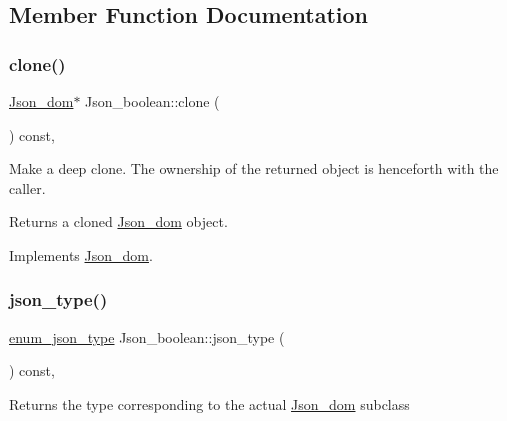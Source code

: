 \subsection{Member Function Documentation}
\mbox{\label{classJson__boolean_a4af266d49e532a2155e68a5b9fbcbff9}} 
\subsubsection{\texorpdfstring{clone()}{clone()}}
{\footnotesize\ttfamily \mbox{\hyperlink{classJson__dom}{Json\+\_\+dom}}$\ast$ Json\+\_\+boolean\+::clone (\begin{DoxyParamCaption}{ }\end{DoxyParamCaption}) const\hspace{0.3cm}{\ttfamily [inline]}, {\ttfamily [virtual]}}

Make a deep clone. The ownership of the returned object is henceforth with the caller.

\begin{DoxyReturn}{Returns}
a cloned \mbox{\hyperlink{classJson__dom}{Json\+\_\+dom}} object. 
\end{DoxyReturn}


Implements \mbox{\hyperlink{classJson__dom_a03c529d590cc4cdb747ccb82f4b70fb5}{Json\+\_\+dom}}.

\mbox{\label{classJson__boolean_a75cc6ab22cb10abd773eec0bce0308ee}} 
\subsubsection{\texorpdfstring{json\+\_\+type()}{json\_type()}}
{\footnotesize\ttfamily \mbox{\hyperlink{classJson__dom_af37eed7dfe1da1d6507d3ab85320eb03}{enum\+\_\+json\+\_\+type}} Json\+\_\+boolean\+::json\+\_\+type (\begin{DoxyParamCaption}{ }\end{DoxyParamCaption}) const\hspace{0.3cm}{\ttfamily [inline]}, {\ttfamily [virtual]}}

\begin{DoxyReturn}{Returns}
the type corresponding to the actual \mbox{\hyperlink{classJson__dom}{Json\+\_\+dom}} subclass 
\end{DoxyReturn}


